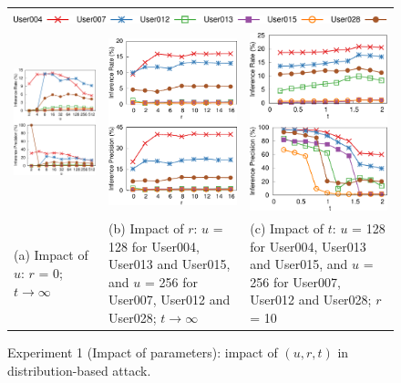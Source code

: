 \documentclass[bachelor]{thesis-uestc}
\begin{document}
\begin{figure}[t]
    \centering
    \begin{tabular}{p{}p{}p{}}
        \multicolumn{3}{c}{\includegraphics[width=.7\textwidth]{pic/legend-fsl-line.pdf}} \smallskip \\
        \includegraphics[width=.3\textwidth]{pic/distribution-impact-u.pdf} &
        \includegraphics[width=.3\textwidth]{pic/distribution-impact-r.pdf} &
	    \includegraphics[width=.3\textwidth]{pic/distribution-impact-t.pdf} \medskip \\
        {\footnotesize 
        \centering
        (a) Impact of $u$: $r$ = 0; $t \rightarrow \infty$
        } &
        {\footnotesize
        (b) Impact of $r$: $u$ = 128 for User004, User013 and User015, and $u$ = 256 for User007, User012 and User028; $t \rightarrow \infty$
        } &
        {\footnotesize
        (c) Impact of $t$: $u$ = 128 for User004, User013 and User015, and $u$ = 256 for User007, User012 and User028; $r$ = 10
        } \\
    \end{tabular}
    \caption{Experiment 1 (Impact of parameters): impact of $(u, r, t)$ in distribution-based attack.}
    \label{fig:distribution-impact}
\end{figure}
\end{document}
